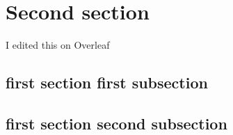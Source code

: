 \documentclass[class=article, crop=false]{standalone}
\begin{document}
\section{Second section}

I edited this on Overleaf

\subsection{first section first subsection}

\blindtext

\subsection{first section second subsection}

\blindtext
\end{document}
